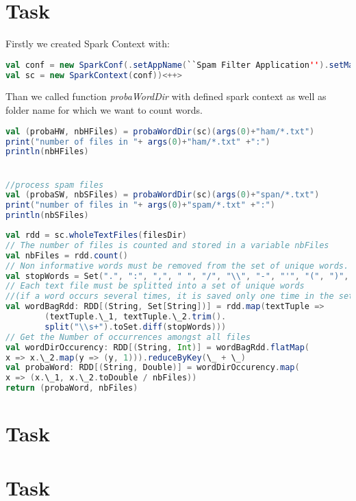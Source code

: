 \documentclass[paper=a4, fontsize=11pt]{scrartcl}
\numberwithin{equation}{section}		%
\numberwithin{figure}{section}			%
\numberwithin{table}{section}				%
\begin{document}
\section{Task}
Firstly we created Spark Context with:
\begin{lstlisting}[language=scala]
val conf = new SparkConf(.setAppName(``Spam Filter Application'').setMaster(``local'')
val sc = new SparkContext(conf))<++>
\end{lstlisting}
Than we called function \textit{probaWordDir} with defined spark context as well as folder name for which we want to count words.
\begin{lstlisting}[language=scala]
val (probaHW, nbHFiles) = probaWordDir(sc)(args(0)+"ham/*.txt")
print("number of files in "+ args(0)+"ham/*.txt" +":")
println(nbHFiles)


//process spam files
val (probaSW, nbSFiles) = probaWordDir(sc)(args(0)+"span/*.txt")
print("number of files in "+ args(0)+"spam/*.txt" +":")
println(nbSFiles)
\end{lstlisting}
\begin{lstlisting}[language=scala]
val rdd = sc.wholeTextFiles(filesDir)
// The number of files is counted and stored in a variable nbFiles
val nbFiles = rdd.count()
// Non informative words must be removed from the set of unique words. 
val stopWords = Set(".", ":", ",", " ", "/", "\\", "-", "'", "(", ")", "@")
// Each text file must be splitted into a set of unique words 
//(if a word occurs several times, it is saved only one time in the set).
val wordBagRdd: RDD[(String, Set[String])] = rdd.map(textTuple =>
        (textTuple.\_1, textTuple.\_2.trim().
        split("\\s+").toSet.diff(stopWords)))
// Get the Number of occurrences amongst all files
val wordDirOccurency: RDD[(String, Int)] = wordBagRdd.flatMap(
x => x.\_2.map(y => (y, 1))).reduceByKey(\_ + \_)
val probaWord: RDD[(String, Double)] = wordDirOccurency.map(
x => (x.\_1, x.\_2.toDouble / nbFiles))
return (probaWord, nbFiles)

\end{lstlisting}


\section{Task}
\section{Task}
\end{document}
